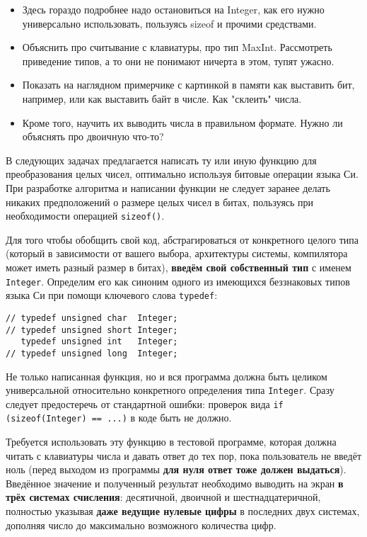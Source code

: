 \begin{itemize}
    \item Здесь гораздо подробнее надо остановиться на Integer, как его нужно универсально использовать, пользуясь sizeof и прочими средствами. 
    
    \item Объяснить про считывание с клавиатуры, про тип MaxInt. Рассмотреть приведение типов, а то они не понимают ничерта в этом, тупят ужасно.
    \item Показать на наглядном примерчике с картинкой в памяти как выставить бит, например, или как выставить байт в числе. Как "склеить" числа.
    \item Кроме того, научить их выводить числа в правильном формате. Нужно ли объяснять про двоичную что-то?
\end{itemize}
В следующих задачах предлагается написать ту или иную функцию для
преобразования целых чисел, оптимально используя битовые операции языка Си.
При разработке алгоритма и написании функции не следует заранее делать никаких
предположений о размере целых чисел в битах, пользуясь при необходимости
операцией \texttt{sizeof()}.

Для того чтобы обобщить свой код, абстрагироваться от конкретного целого типа
(который в зависимости от вашего выбора, архитектуры системы, компилятора
может иметь разный размер в битах), \textbf{введём свой собственный тип} с
именем \texttt{Integer}. Определим его как синоним одного из имеющихся
беззнаковых типов языка Си при помощи ключевого слова \texttt{typedef}:

\medskip
\begin{verbatim}
// typedef unsigned char  Integer;
// typedef unsigned short Integer;
   typedef unsigned int   Integer;
// typedef unsigned long  Integer;
\end{verbatim}
\medskip

Не только написанная функция, но и вся программа должна быть целиком
универсальной относительно конкретного определения типа \texttt{Integer}.
Сразу следует предостеречь от стандартной ошибки: проверок вида
\texttt{if (sizeof(Integer) == ...)} в коде быть не должно.

Требуется использовать эту функцию в тестовой программе, которая должна читать
с клавиатуры числа и давать ответ до тех пор, пока пользователь не введёт ноль
(перед выходом из программы \textbf{для нуля ответ тоже должен выдаться}).
Введённое значение и полученный результат необходимо выводить на экран
\textbf{в трёх системах счисления}: десятичной, двоичной и шестнадцатеричной,
полностью указывая \textbf{даже ведущие нулевые цифры} в последних двух
системах, дополняя число до максимально возможного количества цифр.

